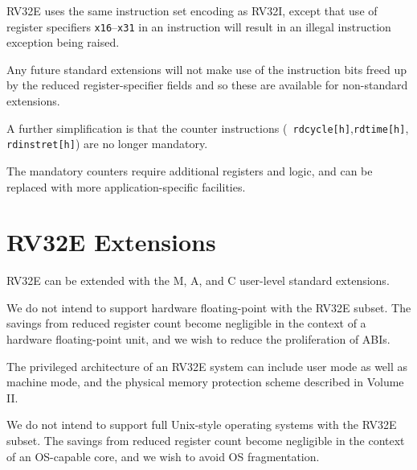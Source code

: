 RV32E uses the same instruction set encoding as RV32I, except that use
of register specifiers {\tt x16}--{\tt x31} in an instruction will
result in an illegal instruction exception being raised.

\begin{commentary}
Any future standard extensions will not make use of the instruction
bits freed up by the reduced register-specifier fields and so these
are available for non-standard extensions.
\end{commentary}

A further simplification is that the counter instructions ({\tt
  rdcycle[h]},{\tt rdtime[h]}, {\tt rdinstret[h]}) are no longer
mandatory.

\begin{commentary}
The mandatory counters require additional registers and logic, and can
be replaced with more application-specific facilities.
\end{commentary}

\section{RV32E Extensions}

RV32E can be extended with the M, A, and C user-level standard extensions.

\begin{commentary}
We do not intend to support hardware floating-point with the RV32E
subset.  The savings from reduced register count become negligible in
the context of a hardware floating-point unit, and we wish to reduce
the proliferation of ABIs.
\end{commentary}

The privileged architecture of an RV32E system can include user mode
as well as machine mode, and the physical memory protection
scheme described in Volume II.

\begin{commentary}
We do not intend to support full Unix-style operating systems with the
RV32E subset.  The savings from reduced register count become
negligible in the context of an OS-capable core, and we wish to avoid
OS fragmentation.
\end{commentary}


